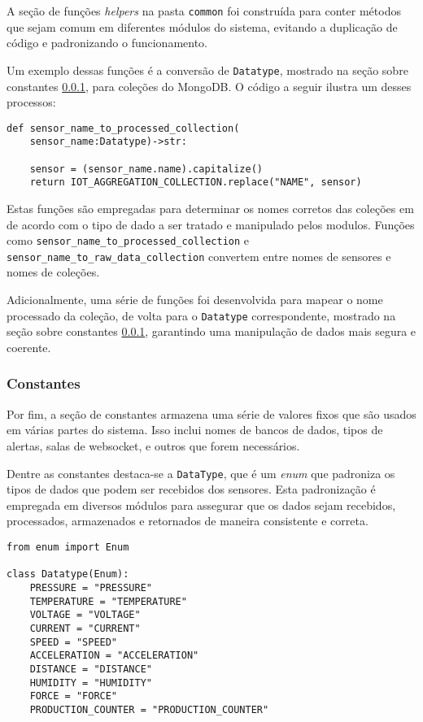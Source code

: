 A seção de funções \textit{helpers} na pasta \texttt{common} foi construída para conter métodos que sejam comum em diferentes módulos do sistema, evitando a duplicação de código e padronizando o funcionamento.

Um exemplo dessas funções é a conversão de \texttt{Datatype}, mostrado na seção sobre constantes \ref{subsubsec:constantes}, para coleções do MongoDB. O código a seguir ilustra um desses processos:

\begin{verbatim}
def sensor_name_to_processed_collection(
    sensor_name:Datatype)->str:
    
    sensor = (sensor_name.name).capitalize()
    return IOT_AGGREGATION_COLLECTION.replace("NAME", sensor)

\end{verbatim}

Estas funções são empregadas para determinar os nomes corretos das coleções em de acordo com o tipo de dado a ser tratado e manipulado pelos modulos. Funções como \texttt{sensor\_name\_to\_processed\_collection} e \texttt{sensor\_name\_to\_raw\_data\_collection} convertem entre nomes de sensores e nomes de coleções. 

Adicionalmente, uma série de funções foi desenvolvida para mapear o nome processado da coleção, de volta para o \texttt{Datatype} correspondente, mostrado na seção sobre constantes \ref{subsubsec:constantes}, garantindo uma manipulação de dados mais segura e coerente.


\subsubsection{Constantes}\label{subsubsec:constantes}
Por fim, a seção de constantes armazena uma série de valores fixos que são usados em várias partes do sistema. Isso inclui nomes de bancos de dados, tipos de alertas, salas de websocket, e outros que forem necessários.

Dentre as constantes destaca-se a \texttt{DataType}, que é um \textit{enum} que padroniza os tipos de dados que podem ser recebidos dos sensores. Esta padronização é empregada em diversos módulos para assegurar que os dados sejam recebidos, processados, armazenados e retornados de maneira consistente e correta.

\begin{verbatim}
from enum import Enum

class Datatype(Enum):
    PRESSURE = "PRESSURE"
    TEMPERATURE = "TEMPERATURE"
    VOLTAGE = "VOLTAGE"
    CURRENT = "CURRENT"
    SPEED = "SPEED"
    ACCELERATION = "ACCELERATION"
    DISTANCE = "DISTANCE"
    HUMIDITY = "HUMIDITY"
    FORCE = "FORCE"
    PRODUCTION_COUNTER = "PRODUCTION_COUNTER"
\end{verbatim}

